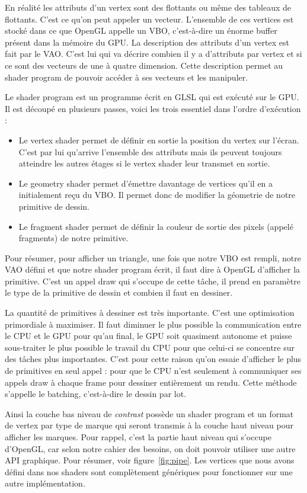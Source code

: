 \documentclass[12pt]{article}
\begin{document}
En réalité les attributs d'un vertex sont des flottants ou même des tableaux de flottants. C'est ce qu'on peut appeler un vecteur. L'ensemble de ces vertices est stocké dans ce
que OpenGL appelle un \gls{VBO}, c'est-à-dire un énorme buffer présent dans la mémoire du GPU. La description des attributs d'un vertex est fait par le \gls{VAO}.
C'est lui qui va décrire combien il y a d'attributs par vertex et si ce sont des vecteurs de une à quatre dimension.
Cette description permet au shader program de pouvoir accéder à ses vecteurs et les manipuler.

Le shader program est un programme écrit en \gls{GLSL} qui est exécuté sur le GPU. Il est découpé en plusieurs passes, voici les trois essentiel dans l'ordre d'exécution :
\begin{itemize}
    \item Le vertex shader permet de définir en sortie la position du vertex sur l'écran. C'est par lui qu'arrive l'ensemble
des attributs mais ils peuvent toujours atteindre les autres étages si le vertex shader leur transmet en sortie.
    \item Le geometry shader permet d'émettre davantage de vertices qu'il en a initialement reçu du VBO. Il permet donc de modifier la géometrie de notre primitive de dessin.
    \item Le fragment shader permet de définir la couleur de sortie des pixels (appelé fragments) de notre primitive.
\end{itemize}

Pour résumer, pour afficher un triangle, une fois que notre VBO est rempli, notre VAO défini et que notre shader program écrit, il faut dire à OpenGL d'afficher la primitive.
C'est un appel \og draw \fg{} qui s'occupe de cette tâche, il prend en paramètre le type de la primitive de dessin et combien il faut en dessiner.

La quantité de primitives à dessiner est très importante. C'est une optimisation primordiale à maximiser. Il faut diminuer le plus possible la communication entre le CPU et le GPU pour
qu'au final, le GPU soit quasiment autonome et puisse sous-traiter le plus possible le travail du CPU pour que celui-ci se concentre sur des tâches plus importantes.
C'est pour cette raison qu'on essaie d'afficher le plus de primitives en seul appel : pour que le CPU n'est seulement à communiquer ses appels draw à chaque frame pour dessiner entièrement
un rendu. Cette méthode s'appelle le batching, c'est-à-dire le dessin par lot.

Ainsi la couche bas niveau de \textit{contrast} possède un shader program et un format de vertex par type de marque qui seront transmis à la couche haut niveau pour afficher les marques.
Pour rappel, c'est la partie haut niveau qui s'occupe d'OpenGL, car selon notre cahier des besoins, on doit pouvoir utiliser une autre API graphique. Pour résumer, voir figure~\ref{fig:pipe}. Les vertices que nous avons
défini dans nos shaders sont complètement génériques pour fonctionner sur une autre implémentation.
\end{document}
